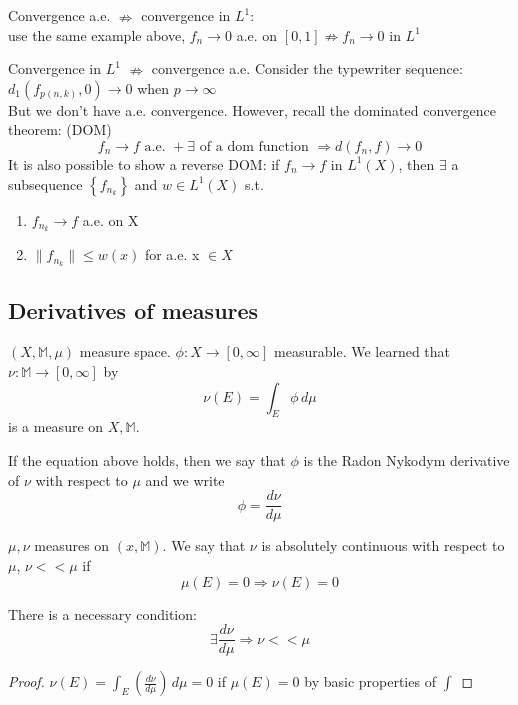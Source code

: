 Convergence a.e. \(\nRightarrow\) convergence in \(L^1\): \\
use the same example above, \(f_n \rightarrow 0\) a.e. on \([0, 1] \nRightarrow f_n \rightarrow 0\) in \(L^1\)

Convergence in \(L^1\) \(\nRightarrow\) convergence a.e.
Consider the typewriter sequence: \( d_1(f_{p(n, k)}, 0) \to 0\) when \( p \to\infty\) \\
But we don't have a.e. convergence. However, recall the dominated convergence theorem: (DOM)
\[ f_n \rightarrow f \text{ a.e. }  + \exists \text{ of a dom function } \Rightarrow d(f_n, f)\rightarrow 0 \]
It is also possible to show a reverse DOM:
if \(f_n \to f \) in \(L^1(X)\), then \(\exists\) a subsequence \(\left\{f_{n_k}\right\}\) and \(w \in L^1(X)\) s.t. 
\begin{enumerate}
    \item \(f_{n_k} \rightarrow f\) a.e. on X
    \item \(\| f_{n_k} \| \leq w(x) \) for a.e. x \(\in X\)
\end{enumerate}

\subsection*{Derivatives of measures}
\(\left(X, \mathbb{M}, \mu \right)\) measure space. 
\(\phi : X \to \left[0, \infty \right]\) measurable. 
We learned that \(\nu: \mathbb{M} \to \left[0, \infty \right]\) by \[\nu(E)= \int_E \phi \, d\mu\] is a measure on \(X, \mathbb{M}\).

If the equation above holds, then we say that \(\phi \) is the Radon Nykodym derivative of \(\nu\) with respect to \(\mu\) and we write \[\phi = \frac{d\nu}{d\mu}\]
\begin{definition}
    \(\mu, \nu  \) measures on \(\left(x, \mathbb{M}\right)\). We say that \(\nu\) is absolutely continuous with respect to \(\mu\), \(\nu << \mu \) if 
    \[\mu(E) = 0 \Rightarrow \nu(E)=0\]
\end{definition}

\begin{lemma}
    There is a necessary condition:
    \[ \exists \frac{d \nu}{d \mu} \Rightarrow \nu << \mu \]
\end{lemma}

\begin{proof}
    \(\nu(E) = \int_E (\frac{d\nu}{d\mu}) \, d\mu = 0\) if \(\mu(E)=0\) by basic properties of \(\int\)
\end{proof}


